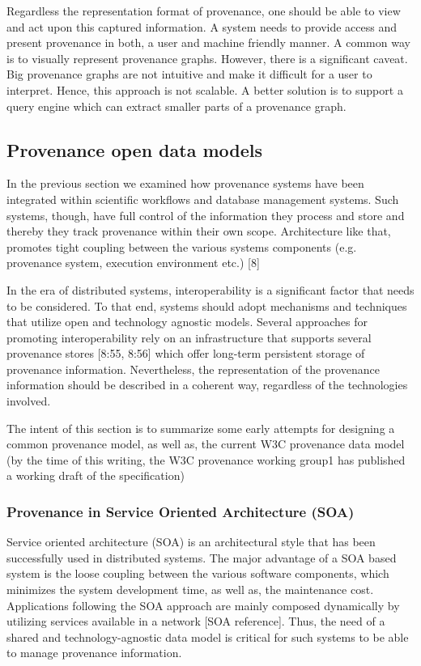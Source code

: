 Regardless the representation format of provenance, one should be able to view and act upon this captured information. A system needs to provide access and present provenance in both, a user and machine friendly manner. A common way is to visually represent provenance graphs. However, there is a significant caveat. Big provenance graphs are not intuitive and make it difficult for a user to interpret. Hence, this approach is not scalable. A better solution is to support a query engine which can extract smaller parts of a provenance graph.

\subsection{Provenance open data models}

In the previous section we examined how provenance systems have been integrated within scientific workflows and database management systems. Such systems, though, have full control of the information they process and store and thereby they track provenance within their own scope. Architecture like that, promotes tight coupling between the various systems components (e.g. provenance system, execution environment etc.) [8]

In the era of distributed systems, interoperability is a significant factor that needs to be considered. To that end, systems should adopt mechanisms and techniques that utilize open and technology agnostic models. Several approaches for promoting interoperability rely on an infrastructure that supports several provenance stores [8:55, 8:56] which offer long-term persistent storage of provenance information. Nevertheless, the representation of the provenance information should be described in a coherent way, regardless of the technologies involved.

The intent of this section is to summarize some early attempts for designing a common provenance model, as well as, the current W3C provenance data model (by the time of this writing, the W3C provenance working group1 has published a working draft of the specification)


\subsubsection{Provenance in Service Oriented Architecture (SOA)}

Service oriented architecture (SOA) is an architectural style that has been successfully used in distributed systems. The major advantage of a SOA based system is the loose coupling between the various software components, which minimizes the system development time, as well as, the maintenance cost. Applications following the SOA approach are mainly composed dynamically by utilizing services available in a network [SOA reference]. Thus, the need of a shared and technology-agnostic data model is critical for such systems to be able to manage provenance information.

